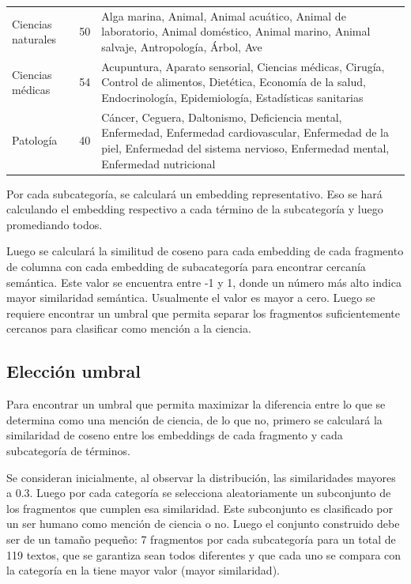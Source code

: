 \documentclass[11pt,a4paper]{article}
\begin{document}
{\begin{longtable}{p{3.5cm}P{2cm}p{9cm}}
			Ciencias naturales & 50 & Alga marina, Animal, Animal acuático, Animal de laboratorio, Animal doméstico, Animal marino, Animal salvaje, Antropología, Árbol, Ave \\
			
			Ciencias médicas & 54 & Acupuntura, Aparato sensorial, Ciencias médicas, Cirugía, Control de alimentos, Dietética, Economía de la salud, Endocrinología, Epidemiología, Estadísticas sanitarias \\
			
			Patología & 40 & Cáncer, Ceguera, Daltonismo, Deficiencia mental, Enfermedad, Enfermedad cardiovascular, Enfermedad de la piel, Enfermedad del sistema nervioso, Enfermedad mental, Enfermedad nutricional \\
			
		\end{longtable}
	}
			
	
	
	
	
	
	
	Por cada subcategoría, se calculará un embedding representativo. Eso se hará calculando el embedding respectivo a cada término de la subcategoría y luego promediando todos.
	
	Luego se calculará la similitud de coseno para cada embedding de cada fragmento de columna con cada embedding de subacategoría para encontrar cercanía  semántica. Este valor se encuentra entre -1 y 1, donde un número más alto indica mayor similaridad semántica. Usualmente el valor es mayor a cero. Luego se requiere encontrar un umbral que permita separar los fragmentos suficientemente cercanos para clasificar como mención a la ciencia.
	
	\subsection{Elección umbral}
	Para encontrar un umbral que permita maximizar la diferencia entre lo que se determina como una mención de ciencia, de lo que no, primero se calculará la similaridad de coseno entre los embeddings de cada fragmento y cada subcategoría de términos. 
	
	Se consideran inicialmente, al observar la distribución, las similaridades mayores a 0.3. Luego por cada categoría se selecciona aleatoriamente un subconjunto de los fragmentos que cumplen esa similaridad. Este subconjunto es clasificado por un ser humano como mención de ciencia o no. Luego el conjunto construido debe ser de un tamaño pequeño: 7 fragmentos por cada subcategoría para un total de 119 textos, que se garantiza sean todos diferentes y que cada uno se compara con la categoría en la tiene mayor valor (mayor similaridad).
	
\end{document}
